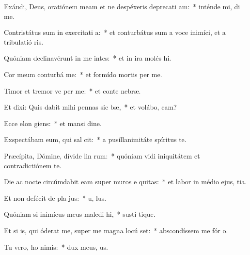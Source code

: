 \item Exáudi, Deus, oratiónem meam et ne despéxeris deprecati am:~* inténde mi,  di me.
\item Contristátus sum in exercitati a:~* et conturbátus sum a voce inimíci, et a tribulatió ris.
\item Quóniam declinavérunt in me intes:~* et in ira molés  hi.
\item Cor meum conturbá   me:~* et formído mortis  per me.
\item Timor et tremor ve per me:~* et conte  nebræ.
\item Et dixi: Quis dabit mihi pennas sic bæ,~* et volábo,  cam?
\item Ecce elon giens:~* et mansi  dine.
\item Exspectábam eum, qui sal  cit:~* a pusillanimitáte spíritus  te.
\item Præcípita, Dómine, dívide lin rum:~* quóniam vidi iniquitátem et contradictiónem  te.
\item Die ac nocte circúmdabit eam super muros e quitas:~* et labor in médio ejus,  tia.
\item Et non defécit de pla jus:~* u,  lus.
\item Quóniam si inimícus meus maledi hi,~* susti tique.
\item Et si is, qui óderat me, super me magna locú set:~* abscondíssem me fór  o.
\item Tu vero, ho nimis:~* dux meus,   us.
